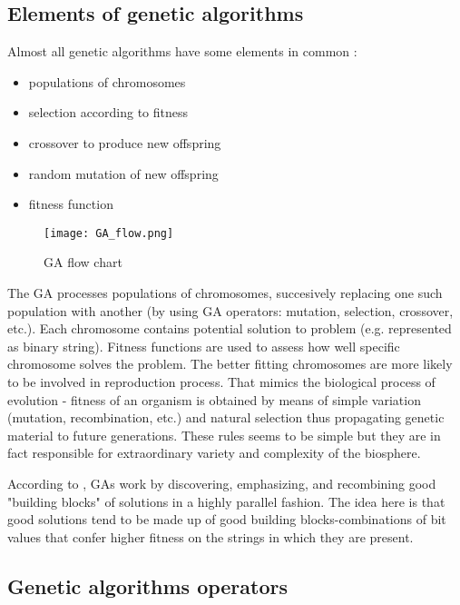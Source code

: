 \subsection{Elements of genetic algorithms}

Almost all genetic algorithms have some elements in common \cite{Mitchell01}:
\begin{itemize}
  \item populations of chromosomes
  \item selection according to fitness
  \item crossover to produce new offspring
  \item random mutation of new offspring
  \item fitness function
\end{itemize}

\begin{figure}[ht]
  \begin{center}
    \texttt{[image: GA\_flow.png]}
  \end{center}
  \caption{GA flow chart \cite{Haupt:2004:PGA:1007746}}
\end{figure}

The GA processes populations of chromosomes, succesively replacing one such population with another (by using GA operators: mutation, selection, crossover, etc.). 
Each chromosome contains potential solution to problem (e.g. represented as binary string). 
Fitness functions are used to assess how well specific chromosome solves the problem.
The better fitting chromosomes are more likely to be involved in reproduction process.
That mimics the biological process of evolution - fitness of an organism is obtained by means of simple variation (mutation, recombination, etc.) and natural selection
thus propagating genetic material to future generations.
These rules seems to be simple but they are in fact responsible for extraordinary variety and complexity of the biosphere.
\cite{Mitchell01} 
 
According to \cite{Mitchell01} , GAs work by discovering, emphasizing, and recombining good "building blocks" of solutions in a highly parallel fashion.
The idea here is that good solutions tend to be made up of good building blocks-combinations of bit values that confer higher fitness on the strings in which they are present.

 

\subsection{Genetic algorithms operators}


